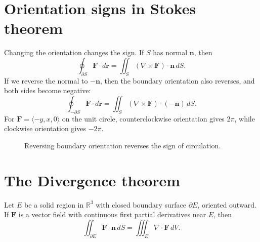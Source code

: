 \documentclass[11pt]{article}
\newcommand{\R}{\mathbb R}
\newcommand{\vr}{\mathbf r}
\newcommand{\vn}{\mathbf n}
\newcommand{\vF}{\mathbf F}
\begin{document}
\section{Orientation signs in Stokes theorem}

Changing the orientation changes the sign. If $S$ has normal $\vn$, then
\[
\oint_{\partial S}\vF\cdot d\vr=\iint_S(\nabla\times\vF)\cdot\vn\,dS.
\]
If we reverse the normal to $-\vn$, then the boundary orientation also reverses, and both sides become negative:
\[
\oint_{-\partial S}\vF\cdot d\vr=\iint_S(\nabla\times\vF)\cdot(-\vn)\,dS.
\]
For $\vF=\langle-y,x,0\rangle$ on the unit circle, counterclockwise orientation gives $2\pi$, while clockwise orientation gives $-2\pi$.

\begin{figure}[H]
\centering
{}
\caption{Reversing boundary orientation reverses the sign of circulation.}
\end{figure}

\section{The Divergence theorem}

\begin{theorembox}
Let $E$ be a solid region in $\R^3$ with closed boundary surface $\partial E$, oriented outward. If $\vF$ is a vector field with continuous first partial derivatives near $E$, then
\[
\iint_{\partial E}\vF\cdot\vn\,dS=\iiint_E\nabla\cdot\vF\,dV.
\]
\end{theorembox}
\end{document}
